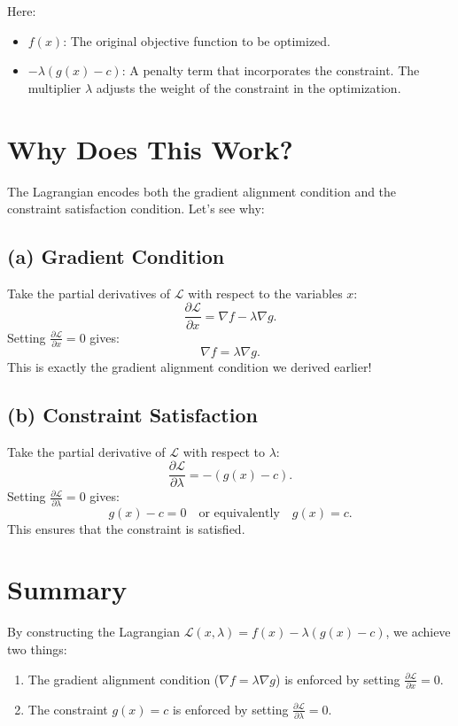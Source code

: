 \documentclass{article}
\begin{document}
Here:
\begin{itemize}
    \item $ f(x) $: The original objective function to be optimized.
    \item $ -\lambda (g(x) - c) $: A penalty term that incorporates the constraint. The multiplier $ \lambda $ adjusts the weight of the constraint in the optimization.
\end{itemize}

\section*{Why Does This Work?}

The Lagrangian encodes both the gradient alignment condition and the constraint satisfaction condition. Let’s see why:

\subsection*{(a) Gradient Condition}

Take the partial derivatives of $ \mathcal{L} $ with respect to the variables $ x $:
\[
\frac{\partial \mathcal{L}}{\partial x} = \nabla f - \lambda \nabla g.
\]
Setting $ \frac{\partial \mathcal{L}}{\partial x} = 0 $ gives:
\[
\nabla f = \lambda \nabla g.
\]
This is exactly the gradient alignment condition we derived earlier!

\subsection*{(b) Constraint Satisfaction}

Take the partial derivative of $ \mathcal{L} $ with respect to $ \lambda $:
\[
\frac{\partial \mathcal{L}}{\partial \lambda} = -(g(x) - c).
\]
Setting $ \frac{\partial \mathcal{L}}{\partial \lambda} = 0 $ gives:
\[
g(x) - c = 0 \quad \text{or equivalently} \quad g(x) = c.
\]
This ensures that the constraint is satisfied.

\section*{Summary}

By constructing the Lagrangian $ \mathcal{L}(x, \lambda) = f(x) - \lambda (g(x) - c) $, we achieve two things:
\begin{enumerate}
    \item The gradient alignment condition ($ \nabla f = \lambda \nabla g $) is enforced by setting $ \frac{\partial \mathcal{L}}{\partial x} = 0 $.
    \item The constraint $ g(x) = c $ is enforced by setting $ \frac{\partial \mathcal{L}}{\partial \lambda} = 0 $.
\end{enumerate}
\end{document}
